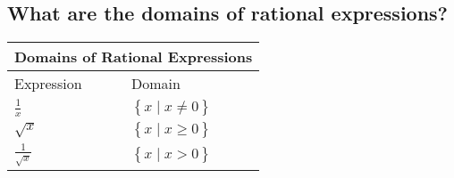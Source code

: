 \subsection{What are the domains of rational expressions?}

\begin{small}
    \begin{tabularx}{1\textwidth}{
            p{}
            p{}
        }
        \toprule
        \multicolumn{2}{c}{\textbf{Domains of Rational Expressions}} \\
        \midrule

        Expression & Domain \\
        \midrule

        $ \frac{1}{x} $
        &
        $ \left\{x\mid x \neq 0 \right\} $
        \\
        \midrule

        $ \sqrt{x} $
        &
        $ \left\{x\mid x \geq 0 \right\} $
        \\
        \midrule

        $ \frac{1}{\sqrt{x}} $
        &
        $ \left\{x\mid x > 0 \right\} $
        \\
        \bottomrule
    \end{tabularx}

\end{small}
